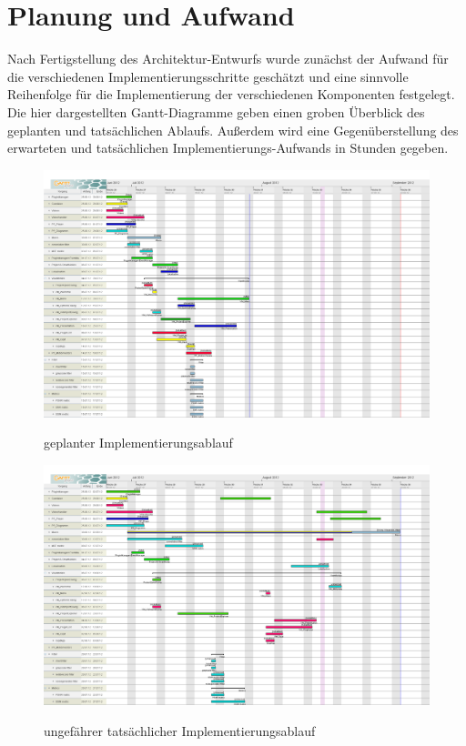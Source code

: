\chapter{Planung und Aufwand}

Nach Fertigstellung des Architektur-Entwurfs wurde zunächst der Aufwand für die verschiedenen Implementierungsschritte geschätzt und eine sinnvolle Reihenfolge für die Implementierung der verschiedenen Komponenten festgelegt.
Die hier dargestellten Gantt-Diagramme geben einen groben Überblick des geplanten und tatsächlichen Ablaufs.
Außerdem wird eine Gegenüberstellung des erwarteten und tatsächlichen Implementierungs-Aufwands in Stunden gegeben.


\begin{figure}
\includegraphics[scale=0.25]{bilder/gantt_planung.png}\\[5ex]
\caption{geplanter Implementierungsablauf}
\end{figure}

\begin{figure}
\includegraphics[scale=0.25]{bilder/gantt_tatsaechlich.png}\\[5ex]
\caption{ungefährer tatsächlicher Implementierungsablauf}
\end{figure}


